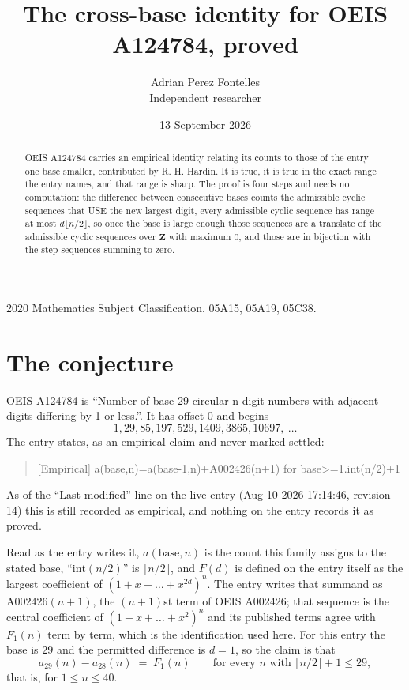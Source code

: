 \documentclass[11pt,a4paper]{article}
\title{The cross-base identity for OEIS A124784, proved}
\author{Adrian Perez Fontelles\\ \small Independent researcher}
\date{13 September 2026}
\theoremstyle{plain}
\theoremstyle{definition}
\begin{document}
\maketitle

\begin{abstract}
OEIS A124784 carries an empirical identity relating its counts to those of the entry one base
smaller, contributed by R. H. Hardin. It is true, it is true in the exact range the entry
names, and that range is sharp. The proof is four steps and needs no computation: the
difference between consecutive bases counts the admissible cyclic sequences that USE the new
largest digit, every admissible cyclic sequence has range at most $d\lfloor n/2\rfloor$, so
once the base is large enough those sequences are a translate of the admissible cyclic
sequences over $\mathbf{Z}$ with maximum $0$, and those are in bijection with the step
sequences summing to zero.
\end{abstract}

\noindent\small 2020 Mathematics Subject Classification. 05A15, 05A19, 05C38.\normalsize

\section{The conjecture}

OEIS A124784 is ``Number of base 29 circular n-digit numbers with adjacent digits differing by 1 or less.''. It has offset $0$ and begins
\[
1, 29, 85, 197, 529, 1409, 3865, 10697,\ \dots
\]
The entry states, as an empirical claim and never marked settled:
\begin{quote}
[Empirical] a(base,n)=a(base-1,n)+A002426(n+1) for base>=1.int(n/2)+1
\end{quote}
As of the ``Last modified'' line on the live entry (Aug 10 2026 17:14:46, revision 14)
this is still recorded as empirical, and nothing on the entry records it as proved.

Read as the entry writes it, $a(\mathrm{base},n)$ is the count this family assigns to the
stated base, ``$\mathrm{int}(n/2)$'' is $\lfloor n/2\rfloor$, and $F(d)$ is defined on the
entry itself as the largest coefficient of $(1+x+\dots+x^{2d})^{n}$. The entry writes that summand as $\mathrm{A002426}(n+1)$, the $(n+1)$st term of OEIS A002426; that sequence is the central coefficient of $(1+x+\dots+x^{2})^{n}$ and its published terms agree with $F_{1}(n)$ term by term, which is the identification used here. For this entry
the base is $29$ and the permitted difference is $d=1$, so the claim is that
\[
a_{29}(n)-a_{28}(n)\;=\;F_{1}(n)
\qquad\text{for every } n \text{ with } \lfloor n/2\rfloor+1\le29,
\]
that is, for $1\le n\le40$.
\end{document}
